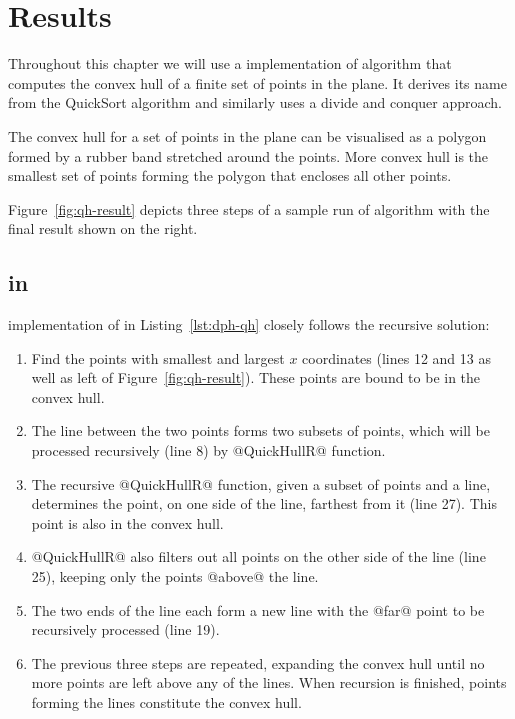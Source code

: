 \documentclass[preamble.tex]{subfiles}
\begin{document}
\clearpage

\chapter{Results}
\label{ch:results}
\label{sec:QuickHull}

Throughout this chapter we will use a  implementation of \QuickHull algorithm \cite{QuickHull} that computes the convex hull of a finite set of points in the plane. It derives its name from the QuickSort algorithm and similarly uses a divide and conquer approach.

The convex hull for a set of points in the plane can be visualised as a polygon formed by a rubber band stretched around the points. More convex hull is the smallest set of points forming the polygon that encloses all other points.

Figure~\ref{fig:qh-result} depicts three steps of a sample run of \QuickHull algorithm with the final result shown on the right.


\section{\QuickHull in \DPH}

 implementation of \QuickHull in Listing~\ref{lst:dph-qh} closely follows the recursive solution:
\begin{enumerate}
  \item Find the points with smallest and largest $x$ coordinates (lines 12 and 13 as well as left of Figure~\ref{fig:qh-result}). These points are bound to be in the convex hull.

  \item The line between the two points forms two subsets of points, which will be processed recursively (line 8) by @QuickHullR@ function.

  \item The recursive @QuickHullR@ function, given a subset of points and a line, determines the point, on one side of the line, farthest from it (line 27). This point is also in the convex hull.

  \item @QuickHullR@ also filters out all points on the other side of the line (line 25), keeping only the points @above@ the line.

  \item The two ends of the line each form a new line with the @far@ point to be recursively processed (line 19).

  \item The previous three steps are repeated, expanding the convex hull until no more points are left above any of the lines. When recursion is finished, points forming the lines constitute the convex hull.
\end{enumerate}
\end{document}
